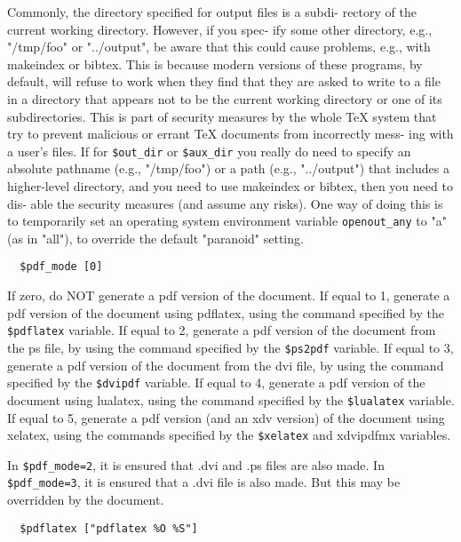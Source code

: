 Commonly,  the  directory specified for output files is a subdi-
rectory of the current working directory.  However, if you spec-
ify  some  other  directory, e.g., "/tmp/foo" or "../output", be
aware that this could cause problems, e.g.,  with  makeindex  or
bibtex.   This  is because modern versions of these programs, by
default, will refuse to work when they find that they are  asked
to  write  to  a  file in a directory that appears not to be the
current working directory or one of its subdirectories.  This is
part  of  security  measures by the whole TeX system that try to
prevent malicious or errant TeX documents from incorrectly mess-
ing with a user's files.  If for \verb|$out_dir| or \verb|$aux_dir| you really
do need to specify an absolute pathname (e.g., "/tmp/foo") or  a
path (e.g., "../output") that includes a higher-level directory,
and you need to use makeindex or bibtex, then you need  to  dis-
able  the  security measures (and assume any risks).  One way of doing this is
to temporarily set an operating system environment variable  \verb|openout_any|
to "a" (as in "all"), to override the default "paranoid" setting.

\begin{verbatim}
  $pdf_mode [0]
\end{verbatim}

If zero, do NOT generate a pdf  version  of  the  document.   If equal  to 1,
generate a pdf version of the document using pdflatex, using the command
specified by the \verb|$pdflatex| variable.   If equal  to  2, generate a pdf
version of the document from the ps file, by using the command specified by
the  \verb|$ps2pdf|  variable.  If  equal  to 3, generate a pdf version of the
document from the dvi file, by using the command specified by  the
\verb|$dvipdf|  variable.  If equal to 4, generate a pdf version of the
document using lualatex, using the command specified by the \verb|$lualatex|
variable.   If  equal  to 5, generate a pdf version (and an xdv version) of the
document using xelatex, using the  commands  specified by the \verb|$xelatex|
and xdvipdfmx variables.

In  \verb|$pdf_mode=2|,  it is ensured that .dvi and .ps files are also
made.  In \verb|$pdf_mode=3|, it is ensured that a .dvi  file  is  also
made.  But this may be overridden by the document.

\begin{verbatim}
  $pdflatex ["pdflatex %O %S"]
\end{verbatim}

